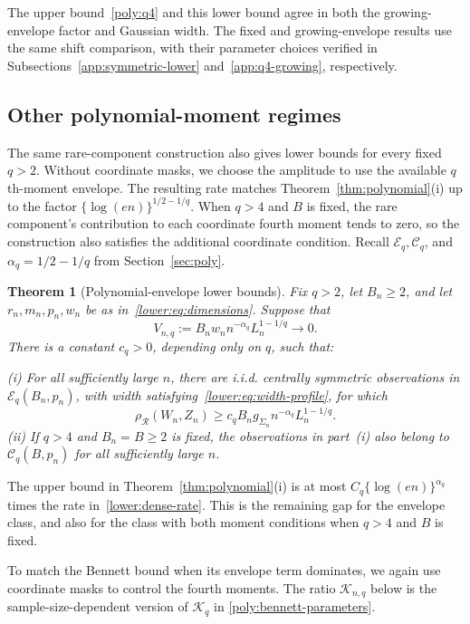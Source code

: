 \documentclass[11pt,letterpaper]{article}
\newtheorem{theorem}{Theorem}
\theoremstyle{remark}
\newcommand{\rh}{\rho_{\mathcal R}}
\begin{document}
The upper bound~\eqref{poly:q4} and this lower bound agree in both
the growing-envelope factor and Gaussian width. The fixed and
growing-envelope results use the same shift comparison, with their
parameter choices verified in Subsections~\ref{app:symmetric-lower}
and~\ref{app:q4-growing}, respectively.

\subsection{Other polynomial-moment regimes}

The same rare-component construction also gives lower bounds for
every fixed $q>2$. Without coordinate masks, we choose the amplitude
to use the available $q$th-moment envelope. The resulting rate matches
Theorem~\ref{thm:polynomial}\textup{(i)} up to the factor
$\{\log(en)\}^{1/2-1/q}$.
When $q>4$ and $B$ is fixed, the rare component's contribution to
each coordinate fourth moment tends to zero, so the construction
also satisfies the additional coordinate condition.
Recall $\mathcal E_q,\mathcal C_q$, and $\alpha_q=1/2-1/q$
from Section~\ref{sec:poly}.

\begin{theorem}[Polynomial-envelope lower bounds]\label{lower:dense}
Fix \(q>2\), let \(B_n\ge2\), and let
\(r_n,m_n,p_n,w_n\) be as in~\eqref{lower:eq:dimensions}.
Suppose that
\[
 V_{n,q}:=B_n w_n n^{-\alpha_q}L_n^{1-1/q}\longrightarrow0.
\]
There is a constant \(c_q>0\), depending only on \(q\), such that:

\noindent\textup{(i)} For all sufficiently large \(n\), there are
i.i.d. centrally symmetric observations in \(\mathcal E_q(B_n,p_n)\),
with width satisfying~\eqref{lower:eq:width-profile}, for which
\begin{equation}
 \rh(W_n,Z_n)\ge c_q B_n g_{\Sigma_n}n^{-\alpha_q}L_n^{1-1/q}.
 \label{lower:dense-rate}
\end{equation}
\noindent\textup{(ii)} If \(q>4\) and \(B_n=B\ge2\) is fixed,
the observations in part~\textup{(i)} also belong to
\(\mathcal C_q(B,p_n)\) for all sufficiently large \(n\).
\end{theorem}

The upper bound in Theorem~\ref{thm:polynomial}\textup{(i)} is at
most $C_q\{\log(en)\}^{\alpha_q}$ times the rate
in~\eqref{lower:dense-rate}. This is the remaining gap for the
envelope class, and also for the class with both moment conditions
when $q>4$ and $B$ is fixed.

To match the Bennett bound when its envelope term dominates, we
again use coordinate masks to control the fourth moments. The
ratio $\mathcal K_{n,q}$ below is the sample-size-dependent version
of $\mathcal K_q$ in \eqref{poly:bennett-parameters}.
\end{document}
